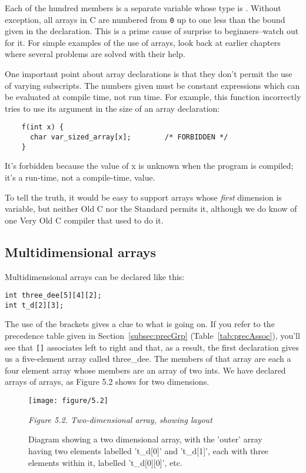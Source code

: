   Each of the hundred members is a separate variable whose type is
   \double. Without exception, all arrays in C are numbered from
   \texttt{0} up to one less than the bound given in the declaration.
   This is a prime cause of surprise to beginners--watch out for it. For
   simple examples of the use of arrays, look back at earlier chapters where
   several problems are solved with their help.


  One important point about array declarations is that they don't permit
   the use of varying subscripts. The numbers given must be constant
   expressions which can be evaluated at compile time, not run time. For
   example, this function incorrectly tries to use its argument in the size
   of an array declaration:


  \begin{Verbatim}
    f(int x) {
      char var_sized_array[x];        /* FORBIDDEN */
    }
  \end{Verbatim}

  It's forbidden because the value of x is unknown when the program is
   compiled; it's a run-time, not a compile-time, value.


  To tell the truth, it would be easy to support arrays whose
   \textit{first} dimension is variable, but neither Old C nor the Standard
   permits it, although we do know of one Very Old C compiler that used to
   do it.


  \subsection{Multidimensional arrays}
   

   Multidimensional arrays can be declared like this:


\begin{Verbatim}
int three_dee[5][4][2];
int t_d[2][3];
\end{Verbatim}

   The use of the brackets gives a clue to what is going on. If you refer
   to the precedence table
   given in Section~\ref{subsec:precGrp} (Table~\ref{tab:precAssoc}),
   you'll see that \texttt{[]} associates left to
    right and that, as a result, the first declaration gives us
    a five-element array called three\_dee. The members of that array are
    each a four element array whose members are an array of two ints. We
    have declared arrays of arrays, as Figure 5.2 shows for two
    dimensions.


    \begin{figure*}\centering
      \texttt{[image: figure/5.2]}
      \caption{Diagram showing a two dimensional array, with the 'outer' array            having two elements labelled 't\_d[0]' and 't\_d[1]', each with            three elements within it, labelled 't\_d[0][0]', etc.}
\begin{center}\textit{Figure 5.2. Two-dimensional array, showing layout}\end{center}    \end{figure*}




